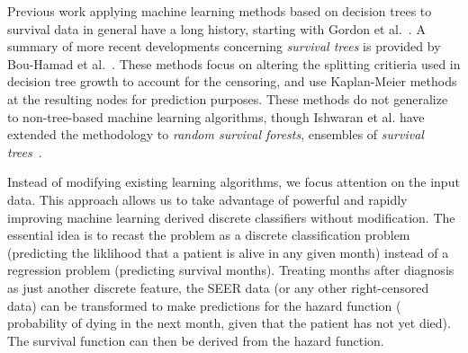 \documentclass[10pt,letterpaper]{article}
\begin{document}


Previous work applying machine learning methods based on decision trees to survival data in general have a long history, starting with Gordon et al.~\cite{Gordon19851065}. A summary of more recent developments concerning \emph{survival trees} is provided by Bou-Hamad et al.~\cite{Bou-Hamad201144}. These methods focus on altering the splitting critieria used in decision tree growth to account for the censoring, and use Kaplan-Meier methods at the resulting nodes for prediction purposes. These methods do not generalize to non-tree-based machine learning algorithms, though Ishwaran et al. have extended the methodology to \emph{random survival forests}, ensembles of \emph{survival trees}~\cite{Ishwaran20101056}.



 Instead of modifying existing learning algorithms, we focus attention on the input data. This approach allows us to take advantage of powerful and rapidly improving machine learning derived discrete classifiers without modification. 
 The essential idea is to recast the problem as a discrete classification problem (predicting the liklihood that a patient is alive in any given month) instead of a regression problem (predicting survival months). Treating months after diagnosis as just another discrete feature, the SEER data (or any other right-censored data) can be transformed to make predictions for the hazard function (
 probability of dying in the next month, given that the patient has not yet died).
The survival function can then be derived from the hazard function.
\end{document}
